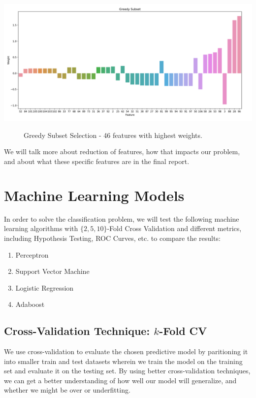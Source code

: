 \documentclass[fleqn]{article}
\begin{document}
    \begin{center}
        \includegraphics[scale=0.27]{46.png}
        \begin{figure}[!h]
            \caption{Greedy Subset Selection - 46 features with highest weights.}
        \end{figure}
    \end{center}


    We will talk more about reduction of features, how that impacts our problem,
    and about what these specific features are in the final report.

    \section{Machine Learning Models}

    In order to solve the classification problem,
    we will test the following machine learning algorithms with $ \{2, 5, 10\} $-Fold Cross
    Validation and different metrics, including Hypothesis Testing, ROC Curves, etc.
    to compare the results:
    \begin{enumerate}
        \item Perceptron
        \item Support Vector Machine
        \item Logistic Regression
        \item Adaboost
    \end{enumerate}

    \subsection{Cross-Validation Technique: $k$-Fold CV}
    We use cross-validation to evaluate the chosen predictive model by paritioning it into
    smaller train and test datasets wherein we train the model on the training set and
    evaluate it on the testing set. By using better cross-validation techniques, we can
    get a better understanding of how well our model will generalize, and whether we might
    be over or underfitting.\\
\end{document}
